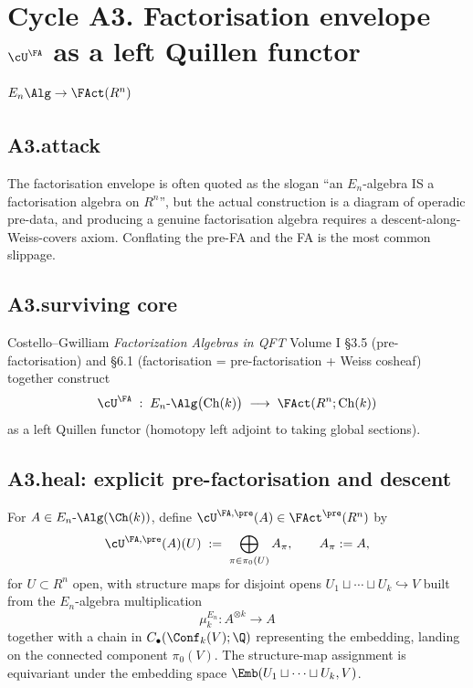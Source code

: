 \section*{Cycle A3. Factorisation envelope $\cU^\FA$ as a left Quillen
functor $E_n\Alg\to\FAct(R^n)$}

\subsection*{A3.attack}

The factorisation envelope is often quoted as the slogan ``an
$E_n$-algebra IS a factorisation algebra on $R^n$'', but the actual
construction is a diagram of operadic pre-data, and producing a
genuine factorisation algebra requires a descent-along-Weiss-covers
axiom. Conflating the pre-FA and the FA is the most common
slippage.

\subsection*{A3.surviving core}

Costello--Gwilliam \emph{Factorization Algebras in QFT} Volume I
\S 3.5 (pre-factorisation) and \S 6.1 (factorisation = pre-factorisation
+ Weiss cosheaf) together construct
\[
\cU^\FA\;:\;E_n\text{-}\Alg\bigl(\mathrm{Ch}(k)\bigr)\;\longrightarrow\;
\FAct(R^n;\mathrm{Ch}(k))
\]
as a left Quillen functor (homotopy left adjoint to taking global
sections).

\subsection*{A3.heal: explicit pre-factorisation and descent}

\begin{definition}
\label{wave-cfg-def:pre-fact-envelope}
For $A\in E_n\text{-}\Alg(\Ch(k))$, define
$\cU^{\FA,\pre}(A)\in\FAct^\pre(R^n)$ by
\[
\cU^{\FA,\pre}(A)(U)\;:=\;
\bigoplus_{\pi\in\pi_0(U)}A_\pi,
\qquad A_\pi:=A,
\]
for $U\subset R^n$ open, with structure maps for disjoint opens
$U_1\sqcup\cdots\sqcup U_k\hookrightarrow V$ built from the
$E_n$-algebra multiplication
\[
\mu_k^{E_n}:A^{\otimes k}\longrightarrow A
\]
together with a chain in $C_\bullet(\Conf_k(V);\Q)$ representing the
embedding, landing on the connected component $\pi_0(V)$. The
structure-map assignment is equivariant under the embedding
space $\Emb(U_1\sqcup\cdots\sqcup U_k,V)$.
\end{definition}

